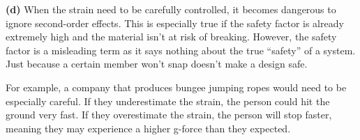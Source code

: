 \documentclass{article}
\begin{document}
\textbf{(d)} When the strain need to be carefully controlled, it becomes dangerous to ignore second-order effects. This is especially true if the safety factor is already extremely high and the material isn't at risk of breaking. However, the safety factor is a misleading term as it says nothing about the true ``safety'' of a system. Just because a certain member won't snap doesn't make a design safe.

For example, a company that produces bungee jumping ropes would need to be especially careful. If they underestimate the strain, the person could hit the ground very fast. If they overestimate the strain, the person will stop faster, meaning they may experience a higher g-force than they expected.
\end{document}
